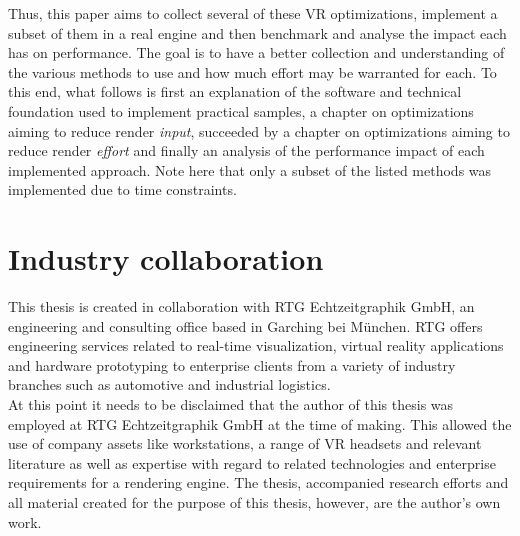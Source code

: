 Thus, this paper aims to collect several of these VR optimizations, implement a subset of them in a real engine and then benchmark and analyse the impact each has on performance. The goal is to have a better collection and understanding of the various methods to use and how much effort may be warranted for each. 
To this end, what follows is first an explanation of the software and technical foundation used to implement practical samples, a chapter on optimizations aiming to reduce render \textit{input}, succeeded by a chapter on optimizations aiming to reduce render \textit{effort} and finally an analysis of the performance impact of each implemented approach. Note here that only a subset of the listed methods was implemented due to time constraints. 

\section{Industry collaboration}
This thesis is created in collaboration with RTG Echtzeitgraphik GmbH, an engineering and consulting office based in Garching bei München. RTG offers engineering services related to real-time visualization, virtual reality applications and hardware prototyping to enterprise clients from a variety of industry branches such as automotive and industrial logistics\cite{HansiVollmer.2020}. \\
At this point it needs to be disclaimed that the author of this thesis was employed at RTG Echtzeitgraphik GmbH at the time of making. This allowed the use of company assets like workstations, a range of VR headsets and relevant literature as well as expertise with regard to related technologies and enterprise requirements for a rendering engine. The thesis, accompanied research efforts and all material created for the purpose of this thesis, however, are the author's own work. 

